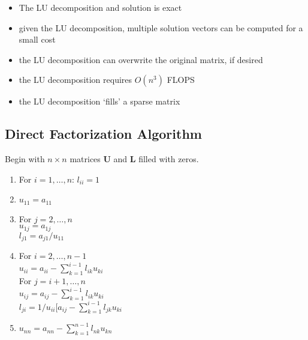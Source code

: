 \documentclass[12pt]{article}
\newcommand{\ve}[1]{\ensuremath{\mathbf{#1}}}
\begin{document}
\begin{itemize}
\item The LU decomposition and solution is exact
\item given the LU decomposition, multiple solution vectors can be computed for a small cost
\item the LU decomposition can overwrite the original matrix, if desired
\item the LU decomposition requires $O(n^3)$ FLOPS
\item the LU decomposition `fills' a sparse matrix
\end{itemize}	

\subsection*{Direct Factorization Algorithm}
Begin with $n \times n$ matrices $\ve{U}$ and $\ve{L}$ filled with zeros.
%
\begin{enumerate}
\item For $i = 1, \dots, n$: $l_{ii} = 1$
\item $u_{11} = a_{11}$

\item For $j = 2, \dots, n$\\
  \hspace*{1 em} $u_{1j} = a_{1j}$\\
  \hspace*{1 em} $l_{j1} = a_{j1}/u_{11}$
 
\item For $i = 2, \dots, n-1$\\
  \hspace*{1 em} $u_{ii} = a_{ii} - \sum_{k=1}^{i-1} l_{ik} u_{ki}$\\
  \hspace*{1 em} For $j = i+1, \dots, n$\\   
    \hspace*{3 em} $u_{ij} = a_{ij} - \sum_{k=1}^{i-1} l_{ik} u_{ki}$\\
    \hspace*{3 em} $l_{ji} = 1/u_{ii}[a_{ij} - \sum_{k=1}^{i-1} l_{jk} u_{ki}$
    
\item $u_{nn} = a_{nn} - \sum_{k=1}^{n-1} l_{nk} u_{kn}$
\end{enumerate}

\end{document}
